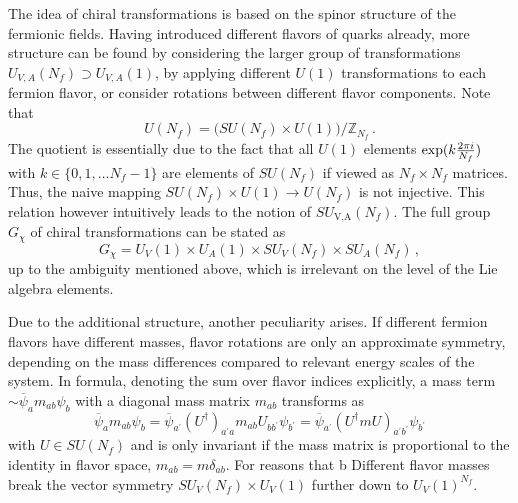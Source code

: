 The idea of chiral transformations is based on the spinor structure of the fermionic fields. Having introduced different flavors of quarks already, more structure can be found by considering the larger group of transformations ${U_{V,A}(N_f)\supset U_{V,A}(1)}$, by applying different $U(1)$ transformations to each fermion flavor, or consider rotations between different flavor components. Note that
\begin{equation}
    U(N_f)=\big(SU(N_f)\times U(1)\big)/\mathbb{Z}_{N_f}\,.
\end{equation}
The quotient is essentially due to the fact that all ${U(1)}$ elements ${\exp(k\frac{2\pi{i}}{N_f})}$ with ${k\in\{0,1,\dots N_f-1\}}$ are elements of ${SU(N_f)}$ if viewed as ${N_f\times N_f}$ matrices. Thus, the naive mapping ${SU(N_f)\times U(1)\to U(N_f)}$ is not injective. This relation however intuitively leads to the notion of ${SU_\text{V,A}(N_f)}$. The full group ${G_\chi}$ of chiral transformations can be stated as
\begin{equation}
    G_\chi=U_V(1)\times U_A(1)\times SU_V(N_f)\times SU_A(N_f)\,,
\end{equation}
up to the ambiguity mentioned above, which is irrelevant on the level of the Lie algebra elements.

Due to the additional structure, another peculiarity arises. If different fermion flavors have different masses, flavor rotations are only an approximate symmetry, depending on the mass differences compared to relevant energy scales of the system. In formula, denoting the sum over flavor indices explicitly, a mass term ${\sim\overline{\psi}_am_{ab}\psi_b}$ with a diagonal mass matrix $m_{ab}$ transforms as
\begin{equation}
    \overline{\psi}_am_{ab}\psi_b=\overline{\psi}_{a^\prime}(U^\dagger)_{a^\prime a}m_{ab}U_{bb^\prime}\psi_{b^\prime}=\overline{\psi}_{a^\prime}(U^\dagger mU)_{a^\prime b^\prime}\psi_{b^\prime}
\end{equation}
with ${U\in SU(N_f)}$ and is only invariant if the mass matrix is proportional to the identity in flavor space, ${m_{ab}=m\delta_{ab}}$. For reasons that b Different flavor masses break the vector symmetry ${SU_V(N_f)\times U_V(1)}$ further down to ${U_V(1)^{N_f}}$.

